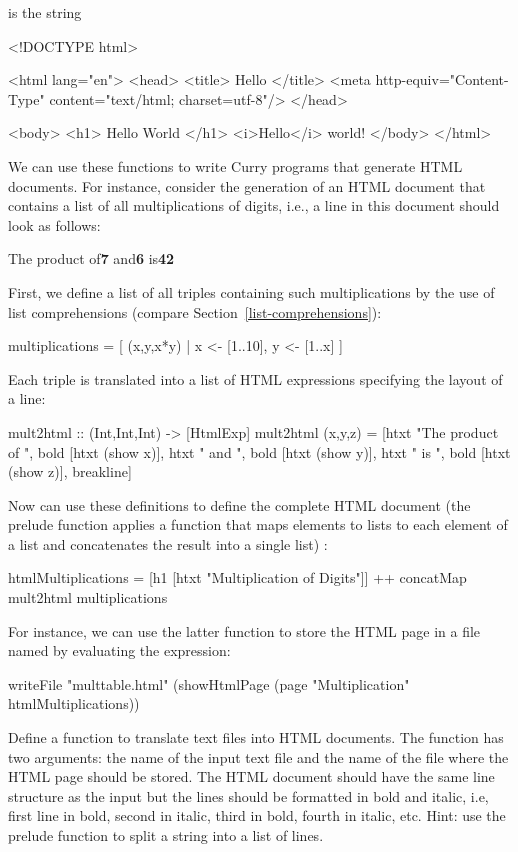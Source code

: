 %
is the string
%
\begin{curry}
<!DOCTYPE html>

<html lang="en">
  <head>
    <title>
      Hello
    </title>
    <meta http-equiv="Content-Type" content="text/html; charset=utf-8"/>
  </head>
  
  <body>
    <h1>
      Hello World
    </h1>
    <i>Hello</i>
    world!
  </body>
</html>
\end{curry}
%
We can use these functions to write Curry programs that generate
HTML documents. For instance, consider the generation of an HTML
document that contains a list of all multiplications of digits,
i.e., a line in this document should look as follows:
\begin{prog}
{\rm The product of{\bf 7} and{\bf 6} is{\bf 42}}
\end{prog}
First, we define a list of all triples containing such multiplications
by the use of list comprehensions (compare Section~\ref{list-comprehensions}):
\begin{curry}
multiplications = [ (x,y,x*y) | x <- [1..10], y <- [1..x] ]
\end{curry}
Each triple is translated into a list of HTML expressions specifying the
layout of a line:
%
\begin{curry}
mult2html :: (Int,Int,Int) -> [HtmlExp]
mult2html (x,y,z) =
 [htxt "The product of ", bold [htxt (show x)],
  htxt " and ", bold [htxt (show y)],
  htxt " is ", bold [htxt (show z)], breakline]
\end{curry}
%
Now can use these definitions to define the complete
HTML document
(the prelude function 
applies a function that maps elements to lists to each element of a list
and concatenates the result into a single list)
:
\begin{curry}
htmlMultiplications =
 [h1 [htxt "Multiplication of Digits"]] ++ concatMap mult2html multiplications
\end{curry}
For instance, we can use the latter function to store the HTML page
in a file named  by evaluating the expression:
\begin{curry}
writeFile "multtable.html"
          (showHtmlPage (page "Multiplication" htmlMultiplications))
\end{curry}
%
\begin{exercise}
Define a function  to translate text files
into HTML documents.
The function has two arguments: the name of the input text file
and the name of the file where the HTML page should
be stored. The HTML document should have the same line structure
as the input but the lines should be formatted in bold and italic, i.e,
first line in bold, second in italic, third in bold, fourth in italic, etc.
Hint: use the prelude function 
to split a string into a list of lines.
\end{exercise}


